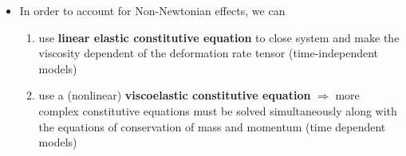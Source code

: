 \documentclass{beamer}
\newtheorem{thm}{Theorem}[theorem]
\begin{document}
%    	
		            
	
	\begin{frame}%
		\begin{itemize}
			\item In order to account for Non-Newtonian effects, we can
			\begin{enumerate}
				\item use \textbf{linear elastic constitutive equation} to close system and make the viscosity dependent of the
deformation rate tensor (time-independent models)
				\item use a (nonlinear) \textbf{viscoelastic constitutive equation} $\Rightarrow$ more complex constitutive equations
must be solved simultaneously along with the equations of conservation of mass and momentum (time dependent models)
\end{enumerate}
		\end{itemize}
		
		
		
	\end{frame}
	
\end{document}

